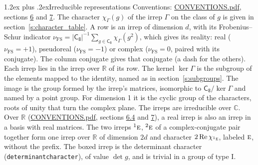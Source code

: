 \documentclass[10pt,a4paper]{article}
\makeatletter
\renewcommand\section{\@startsection{section}{1}{\z@}{-3ex plus -1ex minus -.2ex}%
  {1.2ex plus .2ex}{\normalfont\large\sffamily\bfseries\color{parttitle}}}
\numberwithin{equation}{section}
\newcommand{\grp}[1]{\mathsf{#1}}
\newcommand{\irr}[1]{\text{\normalfont\scshape #1}}
\newcommand{\conjpair}[1]{{}^{#1}}
\newcommand{\irchar}[1]{\chi_{#1}}
\newcommand{\fsind}{\nu_{\mathrm{FS}}}
\makeatother
\begin{document}
\section{Irreducible representations}\label{s:irreps}
Conventions: \href{../../CONVENTIONS.pdf}{CONVENTIONS.pdf}, sections \href{../../CONVENTIONS.pdf\#conv.6}{6} and \href{../../CONVENTIONS.pdf\#conv.7}{7}.
\leavevmode\label{n:function.character}\label{n:irrep.Gamma}The character $\irchar{\Gamma}(g)$ of the irrep $\Gamma$ on the class of $g$ is given in section~\ref{s:character_table}.
\leavevmode\label{n:index.dimension}\label{n:index.frobenius}\label{n:head.irrep}\label{n:head.reality}A row is an irrep of dimension $d$, with its Frobenius--Schur indicator $\fsind = |\grp{C_{8}}|^{-1}\allowbreak\sum_{g\in\grp{C_{8}}}\irchar{\Gamma}(g^2)$, which gives its reality: real ($\fsind = +1$), pseudoreal ($\fsind = -1$) or complex ($\fsind = 0$, paired with its conjugate). \label{n:head.conjugate}The column conjugate gives that conjugate (a dash for the others). \label{n:head.over.real}Each irrep lies in the irrep over $\mathbb{R}$ of its row. \label{n:head.kernel}The kernel $\ker\Gamma$ is the subgroup of the elements mapped to the identity, named as in section~\ref{s:subgroups}. \label{n:head.image}The image is the group formed by the irrep's matrices, isomorphic to $\grp{C_{8}}/\ker\Gamma$ and named by a point group. For dimension 1 it is the cyclic group of the characters, roots of unity that turn the complex plane. The irreps are irreducible over $\mathbb{C}$. Over $\mathbb{R}$ (\href{../../CONVENTIONS.pdf}{CONVENTIONS.pdf}, sections \href{../../CONVENTIONS.pdf\#conv.6.4}{6.4} and \href{../../CONVENTIONS.pdf\#conv.7}{7}), a real irrep is also an irrep in a basis with real matrices. The two irreps $\conjpair{1}\irr{e}$, $\conjpair{2}\irr{e}$ of a complex-conjugate pair together form one irrep over $\mathbb{R}$ of dimension $2d$ and character $2\operatorname{Re}\irchar{\conjpair{1}\irr{e}}$, labeled $\irr{e}$, without the prefix. \label{n:mark.determinant}The boxed irrep is the determinant character (\texttt{determinantcharacter}), of value $\det g$, and is trivial in a group of type I.
\setlength{\emergencystretch}{2em}\par\setlength{\emergencystretch}{0pt}
\end{document}

